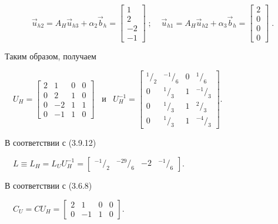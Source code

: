 \documentclass[a4paper]{article}
\newcommand\wideslash[2]{{}^{#1}/_{#2}}
\begin{document}
\begin{equation*}
\vec u_{\mathit{h2}}=A_H\vec u_{\mathit{h3}}+α_2\vec
b_h=\left[\begin{matrix}1\\2\\-2\\-1\end{matrix}\right]\;;\;\;\;\;\vec u_{\mathit{h1}}=A_H\vec u_{\mathit{h2}}+α_3\vec
b_h=\left[\begin{matrix}2\\0\\0\\0\end{matrix}\right]\;.
\end{equation*}
{\begin{russian}\sffamily
Таким образом, получаем
\end{russian}}

{\begin{russian}\sffamily
\ \  $U_H=\left[\begin{matrix}2&1&0&0\\0&2&1&0\\0&-2&1&1\\0&-1&1&0\end{matrix}\right]$ \ и \ 
$U_H^{-1}=\left[\begin{matrix}\wideslash 12&\wideslash{-1}6&0&\wideslash 16\\0&\wideslash
13&1&\wideslash{-1}3\\0&\wideslash 13&1&\wideslash 23\\0&\wideslash 13&1&\wideslash{-4}3\end{matrix}\right]$.
\end{russian}}

{\begin{russian}\sffamily
В соответствии с (3.9.12)
\end{russian}}

{\begin{russian}\sffamily
\ \  $L\equiv
L_H=L_UU_H^{-1}=\left[\begin{matrix}\wideslash{-1}2&\wideslash{-29}6&-2&\wideslash{-1}6\end{matrix}\right]$.
\end{russian}}

{\begin{russian}\sffamily
В соответствии с (3.6.8)
\end{russian}}

{\begin{russian}\sffamily
\ \  $C_U=\mathit{CU}_H=\left[\begin{matrix}2&1&0&0\\0&-1&1&0\end{matrix}\right]$.
\end{russian}}
\end{document}
